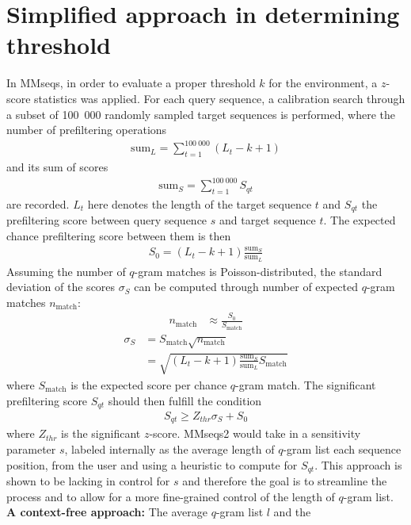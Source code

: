 \documentclass[twoside,a4paper,bsc]{master}
\newcommand{\Qgram}[1]{\(#1\)-gram}
\begin{document}
\section{Simplified approach in determining threshold}
In MMseqs, in order to evaluate a proper threshold \(k\) for the
environment, a \(z\)-score statistics was applied. For each query sequence,
a calibration search through a subset of 100~000 randomly sampled target
sequences is performed, where the number of prefiltering operations
\begin{align}
\text{sum}_L = \sum_{t=1}^{100~000} (L_t-k+1)
\end{align}
and its sum of scores
\begin{align}
\text{sum}_S = \sum_{t=1}^{100~000} S_{qt}
\end{align}
are recorded. \(L_t\) here denotes the length of the target sequence \(t\)
and \(S_{qt}\) the prefiltering score between query sequence \(s\) and
target sequence \(t\). The expected chance prefiltering score between them
is then
\begin{align}
S_0 = (L_t-k+1)\frac{\text{sum}_S}{\text{sum}_L}
\end{align}
Assuming the number of \Qgram{q} matches is Poisson-distributed, the
standard deviation of the scores \(\sigma_S\) can be computed through
number of expected \Qgram{q} matches \(n_{\text{match}}\):
\begin{align}
n_{\text{match}} &\approx \frac{S_0}{S_{\text{match}}}
\end{align}
\begin{align}
\sigma_S &= S_{\text{match}}\sqrt{n_{\text{match}}}\\
&= \sqrt{(L_t-k+1)\frac{\text{sum}_S}{\text{sum}_L}S_{\text{match}}}
\end{align}
where \(S_{\text{match}}\) is the expected score per chance \Qgram{q}
match. The significant prefiltering score \(S_{qt}\) should then fulfill
the condition
\begin{align}
S_{qt} \geq Z_{thr}\sigma_S + S_0
\end{align}
where \(Z_{thr}\) is the significant \(z\)-score. MMseqs2 would take in a
sensitivity parameter \(s\), labeled internally as the average length of
\Qgram{q} list each sequence position, from the user and using a heuristic
to compute for \(S_{qt}\). This approach is shown to be lacking in control
for \(s\) and therefore the goal is to streamline the process and to allow
for a more fine-grained control of the length of \Qgram{q} list.
\textbf{A context-free approach:} The average \Qgram{q} list \(l\) and the
\end{document}
